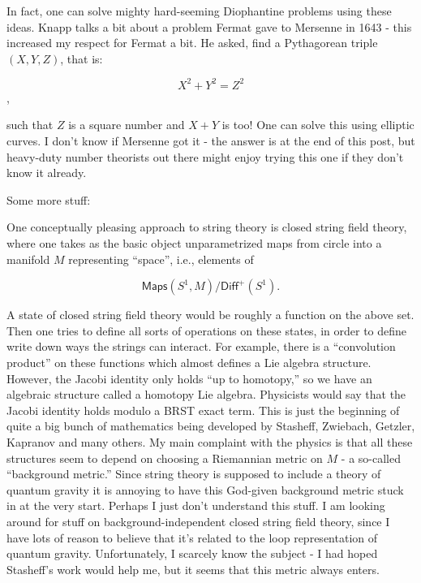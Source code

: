 \documentclass{article}
\def\tightlist{}
\renewcommand{\texttt}[1]{%
  \begingroup
  \ttfamily
  \begingroup\lccode`~=`/\lowercase{\endgroup\def~}{/\discretionary{}{}{}}%
  \begingroup\lccode`~=`[\lowercase{\endgroup\def~}{[\discretionary{}{}{}}%
  \begingroup\lccode`~=`.\lowercase{\endgroup\def~}{.\discretionary{}{}{}}%
  \catcode`/=\active\catcode`[=\active\catcode`.=\active
  \scantokens{#1\noexpand}%
  \endgroup
}
\begin{document}
In fact, one can solve mighty hard-seeming Diophantine problems using
these ideas. Knapp talks a bit about a problem Fermat gave to Mersenne
in 1643 - this increased my respect for Fermat a bit. He asked, find a
Pythagorean triple \((X,Y,Z)\), that is:

\[X^2 + Y^2 = Z^2\],

such that \(Z\) is a square number and \(X + Y\) is too! One can solve
this using elliptic curves. I don't know if Mersenne got it - the answer
is at the end of this post, but heavy-duty number theorists out there
might enjoy trying this one if they don't know it already.

Some more stuff:


One conceptually pleasing approach to string theory is closed string
field theory, where one takes as the basic object unparametrized maps
from circle into a manifold \(M\) representing ``space'', i.e., elements
of

\[\mathsf{Maps}(S^1,M)/\mathsf{Diff}^+(S^1).\]

A state of closed string field theory would be roughly a function on the
above set. Then one tries to define all sorts of operations on these
states, in order to define write down ways the strings can interact. For
example, there is a ``convolution product'' on these functions which
almost defines a Lie algebra structure. However, the Jacobi identity
only holds ``up to homotopy,'' so we have an algebraic structure called
a homotopy Lie algebra. Physicists would say that the Jacobi identity
holds modulo a BRST exact term. This is just the beginning of quite a
big bunch of mathematics being developed by Stasheff, Zwiebach, Getzler,
Kapranov and many others. My main complaint with the physics is that all
these structures seem to depend on choosing a Riemannian metric on \(M\)
- a so-called ``background metric.'' Since string theory is supposed to
include a theory of quantum gravity it is annoying to have this
God-given background metric stuck in at the very start. Perhaps I just
don't understand this stuff. I am looking around for stuff on
background-independent closed string field theory, since I have lots of
reason to believe that it's related to the loop representation of
quantum gravity. Unfortunately, I scarcely know the subject - I had
hoped Stasheff's work would help me, but it seems that this metric
always enters.
\end{document}

